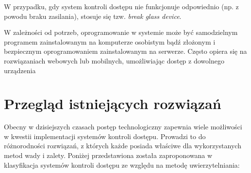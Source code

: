 		W przypadku, gdy system kontroli dostępu nie funkcjonuje odpowiednio (np. z powodu braku zasilania), stosuje się tzw. \textit{break glass device}.

		W zależności od potrzeb, oprogramowanie w systemie może być samodzielnym programem zainstalowanym na komputerze osobistym bądź złożonym i bezpiecznym oprogramowaniem zainstalowanym na serwerze. Często opiera się na rozwiązaniach webowych lub mobilnych, umożliwiając dostęp z dowolnego urządzenia

	\section{Przegląd istniejących rozwiązań}

		Obecny w dzisiejszych czasach postęp technologiczny zapewnia wiele możliwości w kwestii implementacji systemów kontroli dostępu. Prowadzi to do różnorodności rozwiązań, z których każde posiada właściwe dla wykorzystanych metod wady i zalety. Poniżej przedstawiona została zaproponowana w \cite{access-system-survey} klasyfikacja systemów kontroli dostępu ze względu na metodę uwierzytelniania:
